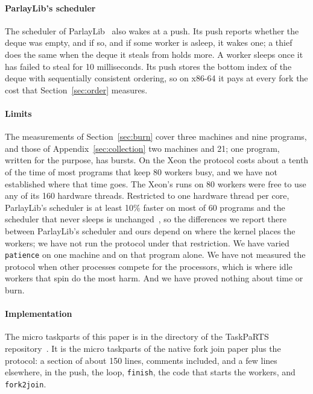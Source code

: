\documentclass[sigplan,nonacm]{acmart}
\begin{document}
\paragraph{ParlayLib's scheduler}
%
The scheduler of ParlayLib~\cite{blelloch20parlaylib} also wakes at a
push.
%
Its push reports whether the deque was empty, and if so, and if some
worker is asleep, it wakes one; a thief does the same when the deque
it steals from holds more.
%
A worker sleeps once it has failed to steal for 10 milliseconds.
%
Its push stores the bottom index of the deque with sequentially
consistent ordering, so on x86-64 it pays at every fork the cost that
Section~\ref{sec:order} measures.

\paragraph{Limits}
%
The measurements of Section~\ref{sec:burn} cover three machines and
nine programs, and those of Appendix~\ref{sec:collection} two machines
and 21; one program, written for the purpose, has bursts.
%
On the Xeon the protocol costs about a tenth of the time of most
programs that keep 80 workers busy, and we have not established where
that time goes.
%
The Xeon's runs on 80 workers were free to use any of its 160
hardware threads.
%
Restricted to one hardware thread per core, ParlayLib's scheduler is
at least 10\% faster on most of 60 programs and the scheduler that
never sleeps is unchanged~\cite{flexibench-suitepercore}, so the
differences we report there between ParlayLib's scheduler and ours
depend on where the kernel places the workers; we have not run the
protocol under that restriction.
%
We have varied \lstinline|patience| on one machine and on that program
alone.
%
We have not measured the protocol when other processes compete for the
processors, which is where idle workers that spin do the most harm.
%
And we have proved nothing about time or burn.

\paragraph{Implementation}
%
The micro taskparts of this paper is in the directory
 of the TaskPaRTS
repository~\cite{taskparts}.
%
It is the micro taskparts of the native fork join paper plus the
protocol: a section of about 150 lines, comments included, and a few
lines elsewhere, in the push, the loop, \lstinline|finish|, the code
that starts the workers, and \lstinline|fork2join|.
\end{document}
